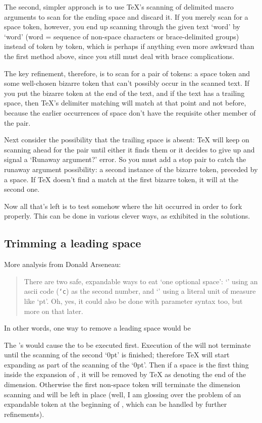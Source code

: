 The second, simpler approach is to use TeX's scanning of delimited
macro arguments to scan for the ending space and discard it. If you
merely scan for a space token, however, you end up scanning through
the given text `word' by `word' (word = sequence of non-space
characters or brace-delimited groups) instead of token by token, which
is perhaps if anything even more awkward than the first method above,
since you still must deal with brace complications.

The key refinement, therefore, is to scan for a pair of tokens: a
space token and some well-chosen bizarre token that can't possibly
occur in the scanned text. If you put the bizarre token at the end of
the text, and if the text has a trailing space, then TeX's delimiter
matching will match at that point and not before, because the earlier
occurrences of space don't have the requisite other member of the pair.

Next consider the possibility that the trailing space is absent: TeX
will keep on scanning ahead for the pair  until either
it finds them or it decides to give up and signal a `Runaway
argument?' error. So you must add a stop pair to catch the runaway
argument possibility: a second instance of the bizarre token, preceded
by a space. If TeX doesn't find a match at the first bizarre token, it
will at the second one.

Now all that's left is to test somehow where the hit occurred in order
to fork properly. This can be done in various clever ways, as
exhibited in the solutions.


\subsection{Trimming a leading space}

More analysis from Donald Arseneau:
\begin{quote}
 There are two safe, expandable ways to eat `one optional space':
 `' using an ascii code (\texttt{`c}) as the second number, and
 `' using a literal unit of measure like `pt'.  Oh, yes,
 it could also be done with parameter syntax too, but more on
 that later.
\end{quote}


In other words, one way to remove a leading space would be
\begin{lcode}
  \expandafter\def\expandafter\foo\expandafter{\ifdim0pt=0pt\foo \fi}
\end{lcode}
The \cmd{\expandafter}'s would cause the  to be executed first.
Execution of the  will not terminate until the scanning of the
second `0pt' is finished; therefore TeX will start expanding \cmd{\foo} as
part of the scanning of the `0pt'. Then if a space is the first thing
inside the expansion of \cmd{\foo}, it will be removed by TeX as denoting
the end of the dimension. Otherwise the first non-space token will
terminate the dimension scanning and will be left in place (well, I am
glossing over the problem of an expandable token at the beginning of
\cmd{\foo}, which can be handled by further refinements).

